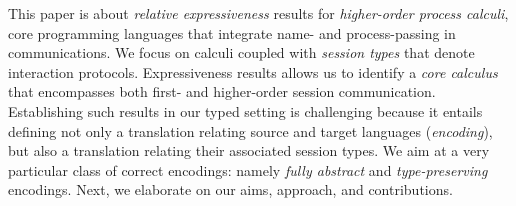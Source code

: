 
This paper is about \emph{relative expressiveness} results for 
\emph{higher-order process calculi}, core programming languages that 
integrate name- and process-passing in communications.
We focus on calculi coupled with \emph{session types} that denote interaction protocols. 
Expressiveness results allows us to 
identify
a \emph{core %
calculus}
that encompasses both first- and higher-order session communication.
Establishing such results 
in our typed setting 
is challenging because 
 it entails defining 
 not only a translation 
relating source and target languages (\emph{encoding}), but also a translation 
relating their associated session types. 
We aim at a very particular class of correct encodings: namely \emph{fully abstract} and \emph{type-preserving} encodings.
Next, we elaborate on our aims,   approach, and contributions.

